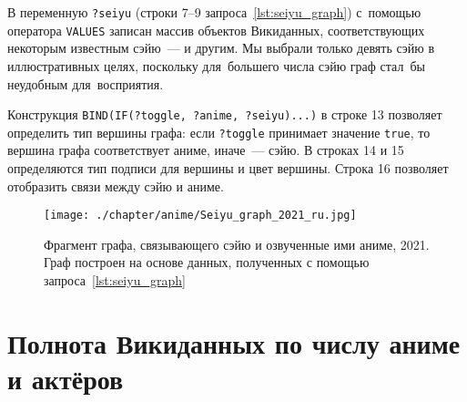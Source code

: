 В переменную \lstinline|?seiyu| (строки 7--9 запроса~\ref{lst:seiyu_graph}) 
с~помощью оператора \lstinline|VALUES| 
записан массив объектов Викиданных, 
соответствующих некоторым известным сэйю~---  и другим. 
Мы выбрали только девять сэйю в иллюстративных целях, 
поскольку для~большего числа сэйю граф стал~бы неудобным для~восприятия.

Конструкция \lstinline|BIND(IF(?toggle, ?anime, ?seiyu)...)| в строке \num{13} 
позволяет определить тип вершины графа: 
если \lstinline|?toggle| принимает значение \lstinline|true|, 
то вершина графа соответствует аниме, иначе~--- сэйю. 
В строках 14 и 15 определяются тип подписи для вершины и цвет вершины. 
Строка 16 позволяет отобразить связи между сэйю и аниме.

\newpage
\begin{figure*}[h!]
	\texttt{[image: ./chapter/anime/Seiyu\_graph\_2021\_ru.jpg]}\centering
	\caption[Граф сэйю и аниме, 2021 год.]{Фрагмент графа, связывающего сэйю и озвученные ими аниме, 2021.\\Граф построен на основе данных, полученных с помощью запроса~\protect\ref{lst:seiyu_graph}}%
      \label{fig:Seiyu_graph_2021_ru}%
\end{figure*} 




\section{Полнота Викиданных по числу аниме и актёров}

